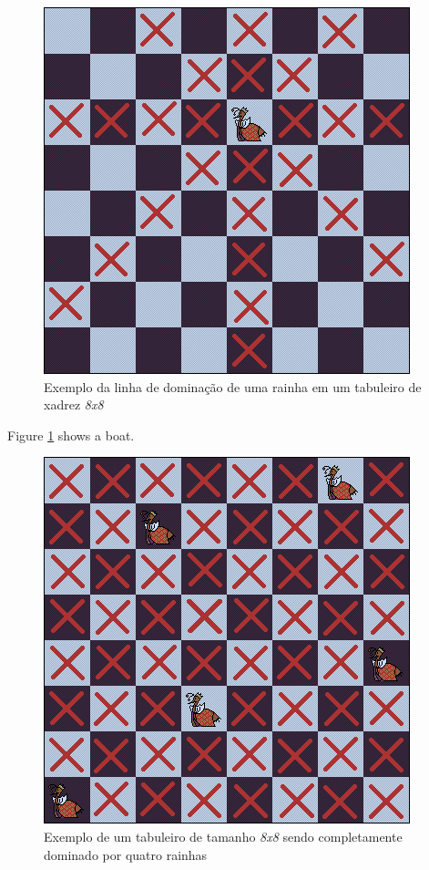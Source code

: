 \documentclass[sigconf]{acmart}
\begin{document}
\begin{figure}
  \includegraphics[width=\linewidth]{dom1rainha8x8.png}
  \caption{Exemplo da linha de dominação de uma rainha em um tabuleiro de xadrez \textit{8x8}}
  \label{fig:1rainha}
\end{figure}

Figure \ref{fig:1rainha} shows a boat.

\begin{figure}
  \includegraphics[width=\linewidth]{dom2rainha8x8.png}
  \caption{Exemplo de um tabuleiro de tamanho \textit{8x8} sendo completamente dominado por
  quatro rainhas}
  \label{fig:2rainha}
\end{figure}
\end{document}
